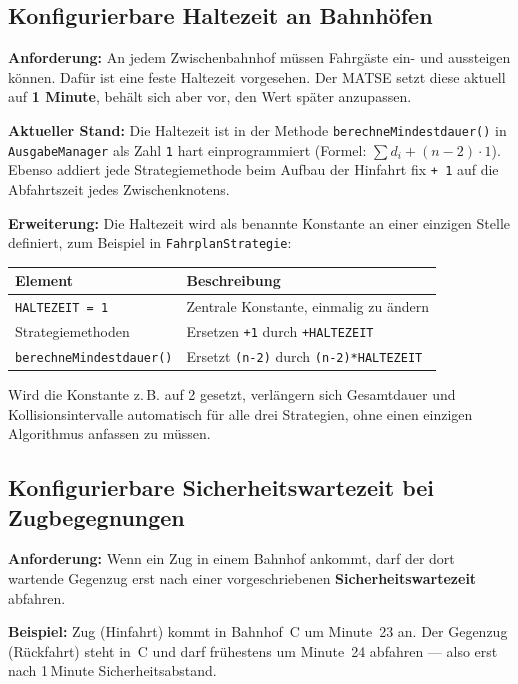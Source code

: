 \documentclass[12pt,a4paper]{article}
\begin{document}
\subsection{Konfigurierbare Haltezeit an Bahnhöfen}

\textbf{Anforderung:}
An jedem Zwischenbahnhof müssen Fahrgäste ein- und aussteigen können.
Dafür ist eine feste Haltezeit vorgesehen.
Der MATSE setzt diese aktuell auf \textbf{1 Minute}, behält sich aber vor,
den Wert später anzupassen.

\textbf{Aktueller Stand:}
Die Haltezeit ist in der Methode \texttt{berechneMindestdauer()} in
\texttt{AusgabeManager} als Zahl \texttt{1} hart einprogrammiert
(Formel: $\sum d_i + (n-2) \cdot 1$).
Ebenso addiert jede Strategiemethode beim Aufbau der Hinfahrt fix
\texttt{+\,1} auf die Abfahrtszeit jedes Zwischenknotens.

\textbf{Erweiterung:}
Die Haltezeit wird als benannte Konstante an einer einzigen Stelle
definiert, zum Beispiel in \texttt{FahrplanStrategie}:

\begin{center}
\begin{tabular}{ll}
\toprule
\textbf{Element} & \textbf{Beschreibung} \\
\midrule
\texttt{HALTEZEIT = 1} & Zentrale Konstante, einmalig zu ändern \\
Strategiemethoden & Ersetzen \texttt{+1} durch \texttt{+HALTEZEIT} \\
\texttt{berechneMindestdauer()} & Ersetzt \texttt{(n-2)} durch \texttt{(n-2)*HALTEZEIT} \\
\bottomrule
\end{tabular}
\end{center}

Wird die Konstante z.\,B. auf 2 gesetzt, verlängern sich Gesamtdauer und
Kollisionsintervalle automatisch für alle drei Strategien, ohne einen
einzigen Algorithmus anfassen zu müssen.

\subsection{Konfigurierbare Sicherheitswartezeit bei Zugbegegnungen}

\textbf{Anforderung:}
Wenn ein Zug in einem Bahnhof ankommt, darf der dort wartende Gegenzug
erst nach einer vorgeschriebenen \textbf{Sicherheitswartezeit} abfahren.

\textbf{Beispiel:} Zug (Hinfahrt) kommt in Bahnhof~C um Minute~23 an.
Der Gegenzug (Rückfahrt) steht in~C und darf frühestens um Minute~24 abfahren —
also erst nach 1\,Minute Sicherheitsabstand.
\end{document}
